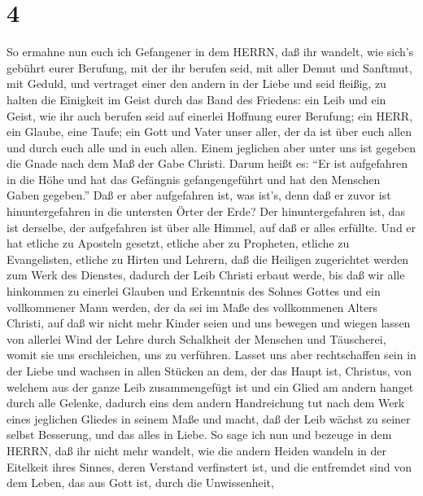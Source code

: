 \hypertarget{section-3}{%
\section{4}\label{section-3}}

 So ermahne nun euch ich Gefangener in dem HERRN, daß ihr
wandelt, wie sich's gebührt eurer Berufung, mit der ihr berufen seid,
 mit aller Demut und Sanftmut, mit Geduld, und vertraget
einer den andern in der Liebe  und seid fleißig, zu halten
die Einigkeit im Geist durch das Band des Friedens:  ein
Leib und ein Geist, wie ihr auch berufen seid auf einerlei Hoffnung
eurer Berufung;  ein HERR, ein Glaube, eine Taufe;
 ein Gott und Vater unser aller, der da ist über euch allen
und durch euch alle und in euch allen.  Einem jeglichen aber
unter uns ist gegeben die Gnade nach dem Maß der Gabe Christi.
 Darum heißt es: ``Er ist aufgefahren in die Höhe und hat
das Gefängnis gefangengeführt und hat den Menschen Gaben gegeben.''
 Daß er aber aufgefahren ist, was ist's, denn daß er zuvor
ist hinuntergefahren in die untersten Örter der Erde?  Der
hinuntergefahren ist, das ist derselbe, der aufgefahren ist über alle
Himmel, auf daß er alles erfüllte.  Und er hat etliche zu
Aposteln gesetzt, etliche aber zu Propheten, etliche zu Evangelisten,
etliche zu Hirten und Lehrern,  daß die Heiligen
zugerichtet werden zum Werk des Dienstes, dadurch der Leib Christi
erbaut werde,  bis daß wir alle hinkommen zu einerlei
Glauben und Erkenntnis des Sohnes Gottes und ein vollkommener Mann
werden, der da sei im Maße des vollkommenen Alters Christi,
 auf daß wir nicht mehr Kinder seien und uns bewegen und
wiegen lassen von allerlei Wind der Lehre durch Schalkheit der Menschen
und Täuscherei, womit sie uns erschleichen, uns zu verführen.
 Lasset uns aber rechtschaffen sein in der Liebe und
wachsen in allen Stücken an dem, der das Haupt ist, Christus,
 von welchem aus der ganze Leib zusammengefügt ist und ein
Glied am andern hanget durch alle Gelenke, dadurch eins dem andern
Handreichung tut nach dem Werk eines jeglichen Gliedes in seinem Maße
und macht, daß der Leib wächst zu seiner selbst Besserung, und das alles
in Liebe.  So sage ich nun und bezeuge in dem HERRN, daß
ihr nicht mehr wandelt, wie die andern Heiden wandeln in der Eitelkeit
ihres Sinnes,  deren Verstand verfinstert ist, und die
entfremdet sind von dem Leben, das aus Gott ist, durch die Unwissenheit,
